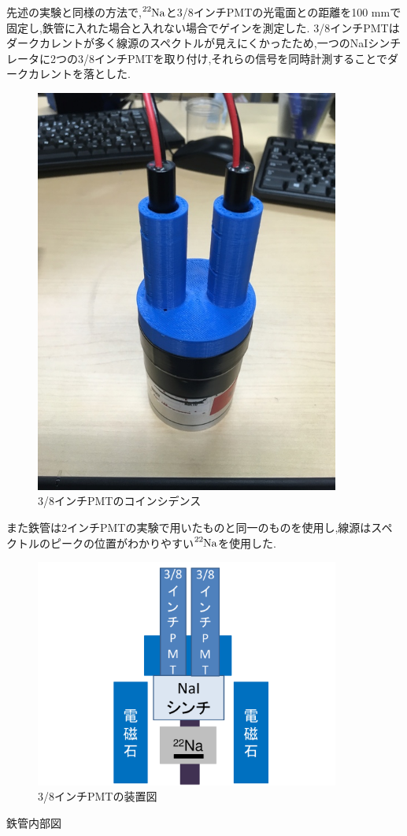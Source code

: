 先述の実験と同様の方法で,$\ce{^{22}Na}$と3/8インチPMTの光電面との距離を100 mmで固定し,鉄管に入れた場合と入れない場合でゲインを測定した.
3/8インチPMTはダークカレントが多く線源のスペクトルが見えにくかったため,一つのNaIシンチレータに2つの3/8インチPMTを取り付け,それらの信号を同時計測することでダークカレントを落とした.
\begin{figure}[H]
	\centering
		\includegraphics[width=10cm]{fig/iguchi/PPMT.jpg}
	\caption{3/8インチPMTのコインシデンス}
	\label{3/8inchcoin}
\end{figure}

また鉄管は2インチPMTの実験で用いたものと同一のものを使用し,線源はスペクトルのピークの位置がわかりやすい$\ce{^{22}Na}$を使用した.
\begin{figure}[H]
	\centering
		\includegraphics[width=10cm]{fig/iguchi/miniset.pdf}
	\caption{3/8インチPMTの装置図}
	\label{miniset}
\end{figure}
鉄管内部図


